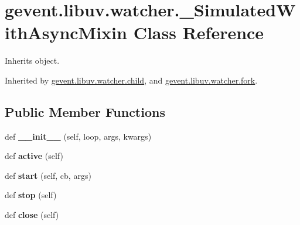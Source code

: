 \hypertarget{classgevent_1_1libuv_1_1watcher_1_1___simulated_with_async_mixin}{}\section{gevent.\+libuv.\+watcher.\+\_\+\+Simulated\+With\+Async\+Mixin Class Reference}
\label{classgevent_1_1libuv_1_1watcher_1_1___simulated_with_async_mixin}


Inherits object.



Inherited by \hyperlink{classgevent_1_1libuv_1_1watcher_1_1child}{gevent.\+libuv.\+watcher.\+child}, and \hyperlink{classgevent_1_1libuv_1_1watcher_1_1fork}{gevent.\+libuv.\+watcher.\+fork}.

\subsection*{Public Member Functions}
\begin{DoxyCompactItemize}
\item 
\mbox{\label{classgevent_1_1libuv_1_1watcher_1_1___simulated_with_async_mixin_a5227f41cdca06b4e06e80896f14caa03}} 
def {\bfseries \+\_\+\+\_\+init\+\_\+\+\_\+} (self, loop, args, kwargs)
\item 
\mbox{\label{classgevent_1_1libuv_1_1watcher_1_1___simulated_with_async_mixin_af8179a6552d44a192d81d1f7e57fa9cc}} 
def {\bfseries active} (self)
\item 
\mbox{\label{classgevent_1_1libuv_1_1watcher_1_1___simulated_with_async_mixin_a8a6d1da38c94ec4a552e1891aa9bdba1}} 
def {\bfseries start} (self, cb, args)
\item 
\mbox{\label{classgevent_1_1libuv_1_1watcher_1_1___simulated_with_async_mixin_a65dfb60b7a5c825d34f1201bee4acbbf}} 
def {\bfseries stop} (self)
\item 
\mbox{\label{classgevent_1_1libuv_1_1watcher_1_1___simulated_with_async_mixin_a7f2f62c4c6388a0299c73d23c5aab3b2}} 
def {\bfseries close} (self)
\end{DoxyCompactItemize}
